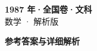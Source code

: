 \documentclass[zihao=-4, a4paper]{ctexart}
\begin{document}
\begin{center}
  {\Large\bfseries 1987 年·全国卷·文科}\\[4pt]
  {\large 数学 · 解析版}
\end{center}
\medskip
{}

\clearpage
{}
\begin{center}{\Large\bfseries 参考答案与详细解析}\end{center}
\medskip

\end{document}
